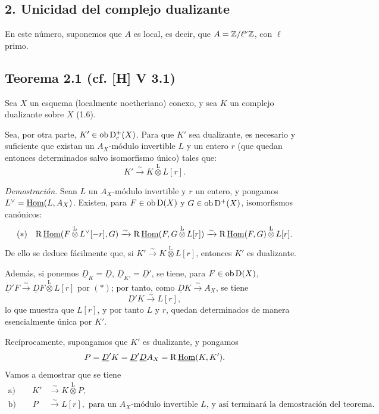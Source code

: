 \subsection*{2. Unicidad del complejo dualizante}

En este número, suponemos que $A$ es local, es decir, que $A = \mathbb{Z}/\ell^{\nu}\mathbb{Z}$, con $\ell$ primo.

\subsection*{Teorema 2.1 (cf. [H] V 3.1)}
Sea $X$ un esquema (localmente noetheriano) conexo, y sea $K$ un complejo dualizante sobre $X$ (1.6).

Sea, por otra parte, $K' \in \operatorname{ob} \mathrm{D}_c^{+}(X)$. Para que $K'$ sea dualizante, es necesario y suficiente que existan un $A_X$-módulo invertible $L$ y un entero $r$ (que quedan entonces determinados salvo isomorfismo único) tales que:
\[
K' \xrightarrow{\sim} K \mathop{\otimes}\limits^{\mathrm{L}} L[r].
\]

\emph{Demostración.} Sean $L$ un $A_X$-módulo invertible y $r$ un entero, y pongamos $L^{\vee} = \underline{\operatorname{Hom}}(L, A_X)$. Existen, para $F \in \operatorname{ob} \mathrm{D}(X)$ y $G \in \operatorname{ob} \mathrm{D}^{+}(X)$, isomorfismos canónicos:
\[
(*) \quad \mathrm{R}\,\underline{\operatorname{Hom}}(F \mathop{\otimes}\limits^{\mathrm{L}} L^{\vee}[-r], G) \xrightarrow{\sim} \mathrm{R}\,\underline{\operatorname{Hom}}(F, G \mathop{\otimes}\limits^{\mathrm{L}} L[r]) \xrightarrow{\sim} \mathrm{R}\,\underline{\operatorname{Hom}}(F,G) \mathop{\otimes}\limits^{\mathrm{L}} L[r].
\]
De ello se deduce fácilmente que, si $K' \xrightarrow{\sim} K \mathop{\otimes}\limits^{\mathrm{L}} L[r]$, entonces $K'$ es dualizante.

Además, si ponemos $\underline{D}_K = \underline{D}$, $\underline{D}_{K'} = \underline{D}'$, se tiene, para $F \in \operatorname{ob} \mathrm{D}(X)$, $\underline{D}'F \xrightarrow{\sim} \underline{D} F \mathop{\otimes}\limits^{\mathrm{L}} L[r]$ por $(*)$; por tanto, como $\underline{D} K \xrightarrow{\sim} A_X$, se tiene
\[
\underline{D}' K \xrightarrow{\sim} L[r],
\]
lo que muestra que $L[r]$, y por tanto $L$ y $r$, quedan determinados de manera esencialmente única por $K'$.

Recíprocamente, supongamos que $K'$ es dualizante, y pongamos
\[
P = \underline{D}'K = \underline{D}'\underline{D} A_X = \mathrm{R}\,\underline{\operatorname{Hom}}(K,K').
\]
Vamos a demostrar que se tiene
\begin{align*}
\text{a)} \qquad K' &\xrightarrow{\sim} K \mathop{\otimes}\limits^{\mathrm{L}} P, \\
\text{b)} \qquad P &\xrightarrow{\sim} L[r], \text{ para un $A_X$-módulo invertible $L$, y así terminará la demostración del teorema.}
\end{align*}

